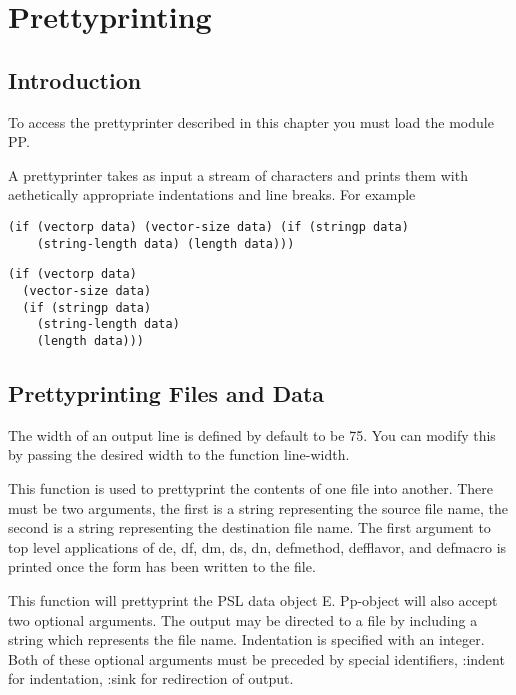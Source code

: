 \chapter*{Prettyprinting}

\section{Introduction}

  To access the prettyprinter described in this chapter you must
load the module PP.

  A  prettyprinter  takes  as  input  a stream of characters and
prints them with aethetically appropriate indentations and  line
breaks.  For example

\begin{verbatim}
(if (vectorp data) (vector-size data) (if (stringp data)
    (string-length data) (length data)))
\end{verbatim}
\begin{verbatim}
(if (vectorp data)
  (vector-size data)
  (if (stringp data)
    (string-length data)
    (length data)))
\end{verbatim}
\section{Prettyprinting Files and Data}

  The  width  of  an output line is defined by default to be 75.
You can modify this by passing the desired width to the function
line-width.


{    This function is used to prettyprint the contents of one
    file  into  another.  There must be two arguments, the first
    is a string representing the source file name, the second is
    a string representing the destination file name.  The  first
    argument  to  top  level applications of de, df, dm, ds, dn,
    defmethod, defflavor, and defmacro is printed once the  form
    has been written to the file.
}

{    This  function  will  prettyprint  the  PSL  data  object E.
    Pp-object will also accept  two  optional  arguments.    The
    output may be directed to a file by including a string which
    represents  the file name.  Indentation is specified with an
    integer.  Both of these optional arguments must be  preceded
    by  special  identifiers, :indent for indentation, :sink for
    redirection of output.
}
